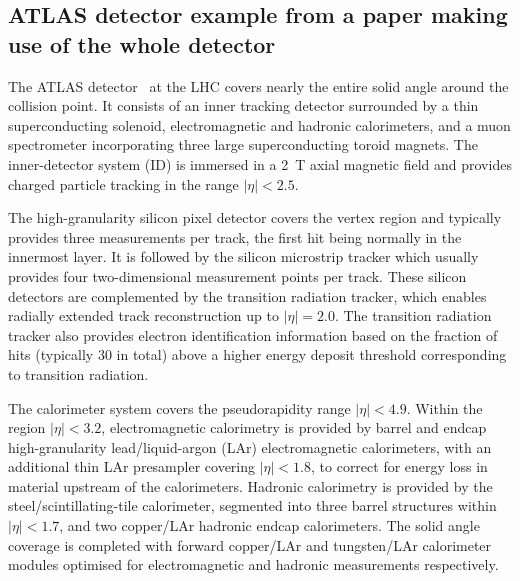 \subsection{ATLAS detector example from a paper making use of the whole detector}
\label{sec:atlas2}

The ATLAS detector~\cite{PERF-2007-01} at the LHC covers nearly the entire solid angle around the collision point.
It consists of an inner tracking detector surrounded by a thin superconducting solenoid, electromagnetic and hadronic calorimeters,
and a muon spectrometer incorporating three large superconducting toroid magnets.
The inner-detector system (ID) is immersed in a \SI{2}{\tesla} axial magnetic field 
and provides charged particle tracking in the range $|\eta| < 2.5$.

The high-granularity silicon pixel detector covers the vertex region and typically provides three measurements per track, 
the first hit being normally in the innermost layer.
It is followed by the silicon microstrip tracker which usually provides four two-dimensional measurement points per track.
These silicon detectors are complemented by the transition radiation tracker,
which enables radially extended track reconstruction up to $|\eta| = 2.0$. 
The transition radiation tracker also provides electron identification information 
based on the fraction of hits (typically 30 in total) above a higher energy deposit threshold corresponding to transition radiation.

The calorimeter system covers the pseudorapidity range $|\eta| < 4.9$.
Within the region $|\eta|< 3.2$, electromagnetic calorimetry is provided by barrel and 
endcap high-granularity lead/liquid-argon (LAr) electromagnetic calorimeters,
with an additional thin LAr presampler covering $|\eta| < 1.8$,
to correct for energy loss in material upstream of the calorimeters.
Hadronic calorimetry is provided by the steel/scintillating-tile calorimeter,
segmented into three barrel structures within $|\eta| < 1.7$, and two copper/LAr hadronic endcap calorimeters.
The solid angle coverage is completed with forward copper/LAr and tungsten/LAr calorimeter modules
optimised for electromagnetic and hadronic measurements respectively.

